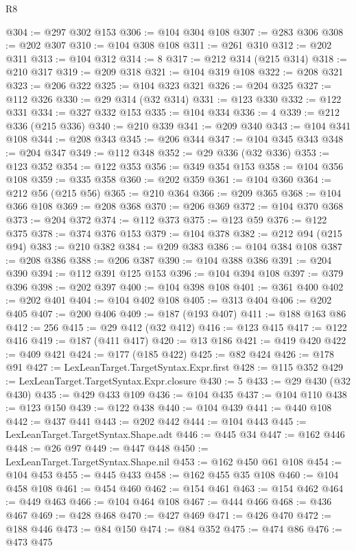 \begin{lexlean}{R8}
\begin{coremodule}
@304 := @297 @302 @153
@306 := @104 @304 @108
@307 := @283 @306
@308 := @202 @307
@310 := @104 @308 @108
@311 := @261 @310
@312 := @202 @311
@313 := @104 @312
@314 := 8
@317 := @212 @314 (@215 @314)
@318 := @210 @317
@319 := @209 @318
@321 := @104 @319 @108
@322 := @208 @321
@323 := @206 @322
@325 := @104 @323 @321
@326 := @204 @325
@327 := @112 @326
@330 := @29 @314 (@32 @314)
@331 := @123 @330
@332 := @122 @331
@334 := @327 @332 @153
@335 := @104 @334
@336 := 4
@339 := @212 @336 (@215 @336)
@340 := @210 @339
@341 := @209 @340
@343 := @104 @341 @108
@344 := @208 @343
@345 := @206 @344
@347 := @104 @345 @343
@348 := @204 @347
@349 := @112 @348
@352 := @29 @336 (@32 @336)
@353 := @123 @352
@354 := @122 @353
@356 := @349 @354 @153
@358 := @104 @356 @108
@359 := @335 @358
@360 := @202 @359
@361 := @104 @360
@364 := @212 @56 (@215 @56)
@365 := @210 @364
@366 := @209 @365
@368 := @104 @366 @108
@369 := @208 @368
@370 := @206 @369
@372 := @104 @370 @368
@373 := @204 @372
@374 := @112 @373
@375 := @123 @59
@376 := @122 @375
@378 := @374 @376 @153
@379 := @104 @378
@382 := @212 @94 (@215 @94)
@383 := @210 @382
@384 := @209 @383
@386 := @104 @384 @108
@387 := @208 @386
@388 := @206 @387
@390 := @104 @388 @386
@391 := @204 @390
@394 := @112 @391 @125 @153
@396 := @104 @394 @108
@397 := @379 @396
@398 := @202 @397
@400 := @104 @398 @108
@401 := @361 @400
@402 := @202 @401
@404 := @104 @402 @108
@405 := @313 @404
@406 := @202 @405
@407 := @200 @406
@409 := @187 (@193 @407)
@411 := @188 @163 @86
@412 := 256
@415 := @29 @412 (@32 @412)
@416 := @123 @415
@417 := @122 @416
@419 := @187 (@411 @417)
@420 := @13 @186
@421 := @419 @420
@422 := @409 @421
@424 := @177 (@185 @422)
@425 := @82 @424
@426 := @178 @91
@427 := LexLeanTarget.TargetSyntax.Expr.first
@428 := @115 @352
@429 := LexLeanTarget.TargetSyntax.Expr.closure
@430 := 5
@433 := @29 @430 (@32 @430)
@435 := @429 @433 @109
@436 := @104 @435
@437 := @104 @110
@438 := @123 @150
@439 := @122 @438
@440 := @104 @439
@441 := @440 @108
@442 := @437 @441
@443 := @202 @442
@444 := @104 @443
@445 := LexLeanTarget.TargetSyntax.Shape.adt
@446 := @445 @34
@447 := @162 @446
@448 := @26 @97
@449 := @447 @448
@450 := LexLeanTarget.TargetSyntax.Shape.nil
@453 := @162 @450 @61 @108
@454 := @104 @453
@455 := @445 @433
@458 := @162 @455 @35 @108
@460 := @104 @458 @108
@461 := @454 @460
@462 := @154 @461
@463 := @154 @462
@464 := @449 @463
@466 := @104 @464 @108
@467 := @444 @466
@468 := @436 @467
@469 := @428 @468
@470 := @427 @469
@471 := @426 @470
@472 := @188 @446
@473 := @84 @150
@474 := @84 @352
@475 := @474 @86
@476 := @473 @475

\end{coremodule}
\end{lexlean}
